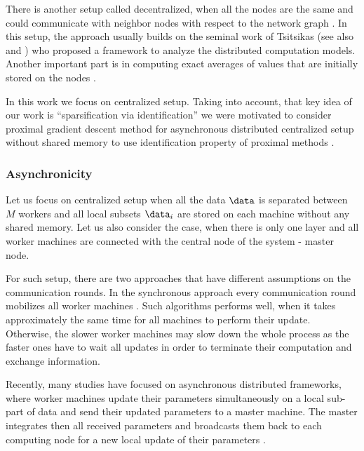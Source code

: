 {There is another setup called decentralized, when all the nodes are the same and could communicate with neighbor nodes with respect to the network graph \cite{nedic2009distributed, boyd2011distributed, duchi2011dual, shi2015extra}. In this setup, the approach usually builds on the seminal work of Tsitsikas \cite{tsitsiklis1984problems} (see also \cite{bertsekas1997parallel} and \cite{tsitsiklis1986distributed}) who proposed a framework to analyze the distributed computation models. Another important part is in computing exact averages of values that are initially stored on the nodes \cite{boyd2011distributed, olshevsky2006convergence,olshevsky2009convergence}. 

In this work we focus on centralized setup. Taking into account, that key idea of our work is ``sparsification via identification'' we were motivated to consider proximal gradient descent method for asynchronous distributed centralized setup without shared memory \cite{mishchenko2018} to use identification property of proximal methods \cite{fadili2018sensitivity}.

\subsubsection{Asynchronicity}\label{sec:basic:distributed-asynchronous}
Let us focus on centralized setup when all the data $\data$ is separated between $M$ workers and all local subsets $\data_i$ are stored on each machine without any shared memory. Let us also consider the case, when there is only one layer and all worker machines are connected with the central node of the system - master node. 

For such setup, there are two approaches that have different assumptions on the communication rounds. In the synchronous approach every communication round mobilizes all worker machines \cite{BoydPCPE11,Chen2016,Tsianos12}. Such algorithms performs well, when it takes approximately the same time for all machines to perform their update. Otherwise, the slower worker machines may slow down the whole process as the faster ones have to wait all updates in order to terminate their computation and exchange information.

Recently, many studies have focused on asynchronous distributed frameworks, where worker machines update their parameters simultaneously on a local sub-part of data and send their updated parameters to a master machine. The master integrates then all received parameters and broadcasts them back to each computing node for a new local update of their parameters \cite{konevcny2016federated,ICML18}.
}


